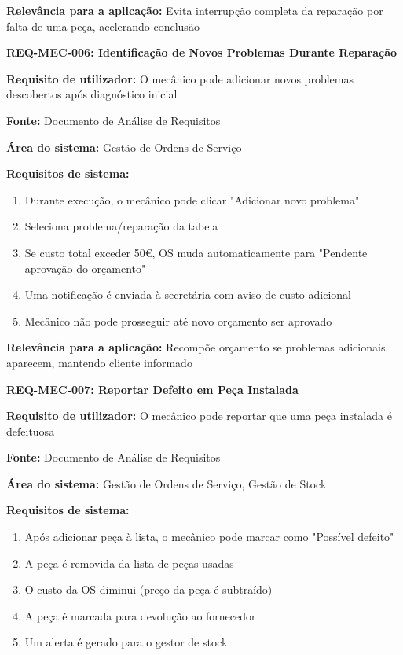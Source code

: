 \documentclass[11pt,a4paper]{article}
\newcommand{\reqheader}[1]{{\noindent\large\bfseries\color{sectionblue}#1}\par\vspace{0.3cm}}
\newcommand{\reqfield}[2]{{\noindent\textbf{#1:} #2}\par\vspace{0.2cm}}
\begin{document}
\reqfield{Relevância para a aplicação}{Evita interrupção completa da reparação por falta de uma peça, acelerando conclusão}

\vspace{0.8cm}

\reqheader{REQ-MEC-006: Identificação de Novos Problemas Durante Reparação}

\reqfield{Requisito de utilizador}{O mecânico pode adicionar novos problemas descobertos após diagnóstico inicial}

\reqfield{Fonte}{Documento de Análise de Requisitos}

\reqfield{Área do sistema}{Gestão de Ordens de Serviço}

\reqfield{Requisitos de sistema}{
	\begin{enumerate}
		\item Durante execução, o mecânico pode clicar "Adicionar novo problema"
		\item Seleciona problema/reparação da tabela
		\item Se custo total exceder 50€, OS muda automaticamente para "Pendente aprovação do orçamento"
		\item Uma notificação é enviada à secretária com aviso de custo adicional
		\item Mecânico não pode prosseguir até novo orçamento ser aprovado
	\end{enumerate}
}

\reqfield{Relevância para a aplicação}{Recompõe orçamento se problemas adicionais aparecem, mantendo cliente informado}

\vspace{0.8cm}

\reqheader{REQ-MEC-007: Reportar Defeito em Peça Instalada}

\reqfield{Requisito de utilizador}{O mecânico pode reportar que uma peça instalada é defeituosa}

\reqfield{Fonte}{Documento de Análise de Requisitos}

\reqfield{Área do sistema}{Gestão de Ordens de Serviço, Gestão de Stock}

\reqfield{Requisitos de sistema}{
	\begin{enumerate}
		\item Após adicionar peça à lista, o mecânico pode marcar como "Possível defeito"
		\item A peça é removida da lista de peças usadas
		\item O custo da OS diminui (preço da peça é subtraído)
		\item A peça é marcada para devolução ao fornecedor
		\item Um alerta é gerado para o gestor de stock
	\end{enumerate}
}
\end{document}

